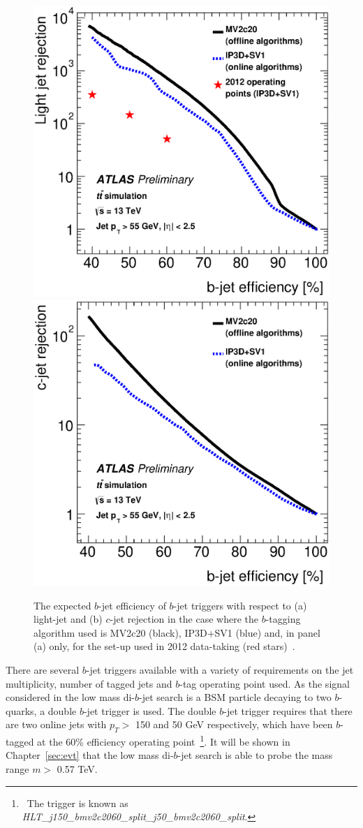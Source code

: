 \begin{figure}[!ht]
  \begin{center}
    \includegraphics[width=0.48\linewidth, angle=0]{figs/Trigger/trig-bTrig_perf_light.eps}
    \includegraphics[width=0.48\linewidth, angle=0]{figs/Trigger/trig-bTrig_perf_charm.eps}
  \end{center}
  \vspace{-1em}
  \caption[The expected $b$-jet efficiency of $b$-jet triggers in Run-2 compared to the set-up used in 2012 data-taking.]
    {The expected $b$-jet efficiency of $b$-jet triggers with respect to (a) light-jet and (b) $c$-jet rejection
    in the case where the $b$-tagging algorithm used is MV2c20 (black), IP3D+SV1 (blue) and, in panel (a) only, for the set-up used in 2012 data-taking (red stars)~\cite{trig-bTrig_desc}.}
  \label{fig:trig-bTrig_perf}
\end{figure}

There are several $b$-jet triggers available
with a variety of requirements on the jet multiplicity, number of tagged jets and $b$-tag operating point used.
As the signal considered in the low mass di-$b$-jet search is a BSM particle decaying to two $b$-quarks, a double $b$-jet trigger is used.
The double $b$-jet trigger requires that there are two online jets with $p_T >$ 150 and 50 GeV respectively,
which have been $b$-tagged at the 60\% efficiency operating point~\footnote{\ The trigger is known as \textit{HLT\_j150\_bmv2c2060\_split\_j50\_bmv2c2060\_split}.}.
It will be shown in Chapter~\ref{sec:evt} that the low mass di-$b$-jet search is able to probe the mass range $m >$ 0.57 TeV.

